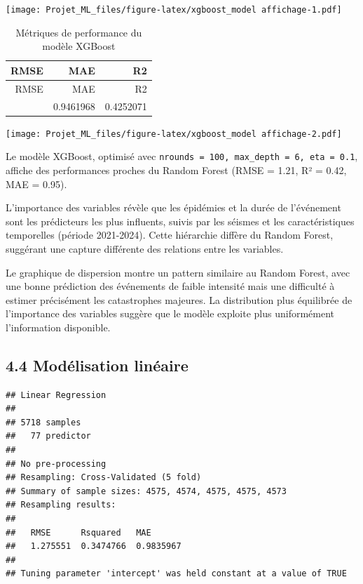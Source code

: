 \documentclass[
]{article}
\begin{document}
\texttt{[image: Projet\_ML\_files/figure-latex/xgboost\_model affichage-1.pdf]}

\begin{longtable}[]{@{}rrr@{}}
\caption{Métriques de performance du modèle XGBoost}\tabularnewline
\toprule\noalign{}
RMSE & MAE & R2 \\
\midrule\noalign{}
\endfirsthead
\toprule\noalign{}
RMSE & MAE & R2 \\
\midrule\noalign{}
\endhead
\bottomrule\noalign{}
\endlastfoot
1.212643 & 0.9461968 & 0.4252071 \\
\end{longtable}

\texttt{[image: Projet\_ML\_files/figure-latex/xgboost\_model affichage-2.pdf]}

Le modèle XGBoost, optimisé avec
\texttt{nrounds\ =\ 100,\ max\_depth\ =\ 6,\ eta\ =\ 0.1}, affiche des
performances proches du Random Forest (RMSE = 1.21, R² = 0.42, MAE =
0.95).

L'importance des variables révèle que les épidémies et la durée de
l'événement sont les prédicteurs les plus influents, suivis par les
séismes et les caractéristiques temporelles (période 2021-2024). Cette
hiérarchie diffère du Random Forest, suggérant une capture différente
des relations entre les variables.

Le graphique de dispersion montre un pattern similaire au Random Forest,
avec une bonne prédiction des événements de faible intensité mais une
difficulté à estimer précisément les catastrophes majeures. La
distribution plus équilibrée de l'importance des variables suggère que
le modèle exploite plus uniformément l'information disponible.

\subsection{4.4 Modélisation
linéaire}\label{moduxe9lisation-linuxe9aire}

\begin{verbatim}
## Linear Regression 
## 
## 5718 samples
##   77 predictor
## 
## No pre-processing
## Resampling: Cross-Validated (5 fold) 
## Summary of sample sizes: 4575, 4574, 4575, 4575, 4573 
## Resampling results:
## 
##   RMSE      Rsquared   MAE      
##   1.275551  0.3474766  0.9835967
## 
## Tuning parameter 'intercept' was held constant at a value of TRUE
\end{verbatim}
\end{document}

